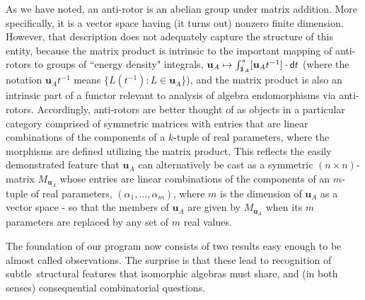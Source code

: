 \documentclass{amsart}
\numberwithin{equation}{section}
\theoremstyle{definition}
\numberwithin{theorem}{section}
\begin{document}
As we have noted, an anti-rotor is an abelian group under matrix addition.  More specifically, it is a vector space having (it turns out) nonzero finite dimension.  However, that description does not adequately capture the structure of this entity, because the matrix product is intrinsic to the important mapping of anti-rotors to groups of ``energy density" integrals, \mbox{$\mathbf{u}_A \mapsto \int_{{\bf 1}_A}^s [\mathbf{u}_At^{-1}]\cdot {\sf d}t$} (where the notation $\mathbf{u}_A t^{-1}$ means $\{L(t^{-1}): L\in \mathbf{u}_A\}$), and the matrix product is also an intrinsic part of a functor relevant to analysis of \mbox{algebra} endomorphisms via anti-rotors.  Accordingly, anti-rotors are better thought of as objects in a particular category comprised of symmetric matrices with entries that are linear combinations of the components of a $k$-tuple of real parameters, where the morphisms are defined utilizing the matrix product.  This reflects the easily demonstrated feature that $\mathbf{u}_A$ can alternatively be cast as a symmetric \mbox{$(n\times n)$-matrix} $M_{\mathbf{u}_A}$ whose entries are linear combinations of the components of an $m$-tuple of real parameters, $(\alpha_1,\dots,\alpha_m)$, where $m$ is the dimension of $\mathbf{u}_A$ as a vector space - so that the members of $\mathbf{u}_A$ are given by $M_{\mathbf{u}_A}$ when its $m$ parameters are replaced by any set of $m$ real values.

The foundation of our program now consists of two results easy enough to be almost called observations. \enlargethispage{1cm} The surprise is that these lead to recognition of \mbox{subtle structural} features that isomorphic algebras must share, and (in both senses) consequential combinatorial questions. 
\end{document}

